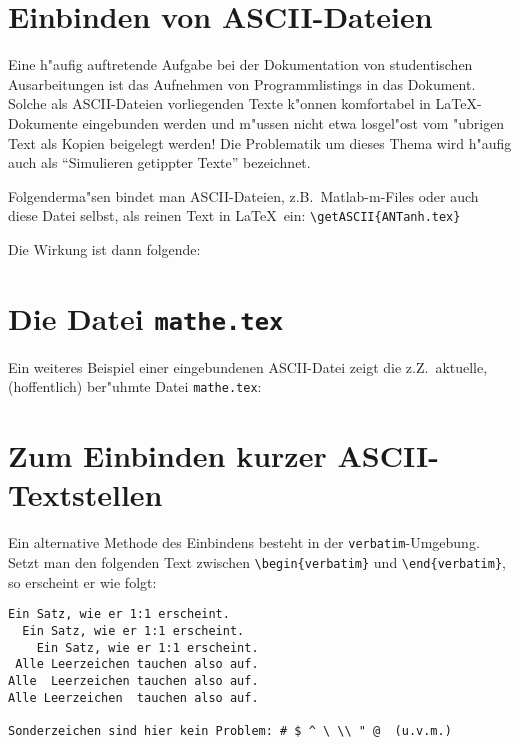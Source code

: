 \begin{appendix}
\chapter{Einbinden von ASCII-Dateien} \label{CPTapp}
\thispagestyle{fancyplain}
%
Eine h"aufig auftretende Aufgabe bei der Dokumentation von studentischen
Ausarbeitungen ist das Aufnehmen von Programmlistings in das Dokument.
Solche als ASCII-Dateien vorliegenden Texte k"onnen komfortabel in 
\LaTeX-Dokumente eingebunden werden und m"ussen nicht etwa losgel"ost 
vom "ubrigen Text als Kopien beigelegt werden! Die Problematik um
dieses Thema wird h"aufig auch als ``Simulieren getippter Texte'' 
bezeichnet.

Folgenderma"sen bindet man ASCII-Dateien, z.B.\ {\sc Matlab}-m-Files oder 
auch diese Datei selbst, als reinen Text in \LaTeX\ ein: \verb+\getASCII{ANTanh.tex}+

Die Wirkung ist dann folgende:


\chapter{Die Datei {\tt mathe.tex}} \label{CPTmehrascii}
%
Ein weiteres Beispiel einer eingebundenen ASCII-Datei zeigt die 
z.Z.\ aktuelle, (hoffentlich) ber"uhmte Datei {\tt mathe.tex}:

\chapter{Zum Einbinden kurzer ASCII-Textstellen}
%
Ein alternative Methode des Einbindens besteht in der {\tt verbatim}-Umgebung.
Setzt man den folgenden Text zwischen \verb+\begin{verbatim}+ und
\verb+\end{verbatim}+, so erscheint er wie folgt:
%
\begin{verbatim}
Ein Satz, wie er 1:1 erscheint.
  Ein Satz, wie er 1:1 erscheint.
    Ein Satz, wie er 1:1 erscheint.
 Alle Leerzeichen tauchen also auf.
Alle  Leerzeichen tauchen also auf.
Alle Leerzeichen  tauchen also auf.

Sonderzeichen sind hier kein Problem: # $ ^ \ \\ " @  (u.v.m.)
\end{verbatim}

\end{appendix}
